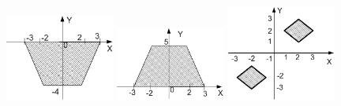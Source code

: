 \begin{figure}[h]%
\begin{floatrow}[3]
{\includegraphics[width=0.32\textwidth,keepaspectratio]{img/ris_3_70}}
{\includegraphics[width=0.32\textwidth,keepaspectratio]{img/ris_3_71}}
{\includegraphics[width=0.32\textwidth,keepaspectratio]{img/ris_3_72}}
\end{floatrow}
\end{figure}%


